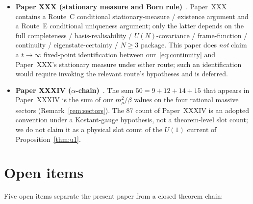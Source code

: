 \documentclass[11pt]{article}
\theoremstyle{definition}
\begin{document}
\begin{itemize}
    \item \textbf{Paper XXX (stationary measure and Born rule)}~\citep{SmartXXX}. Paper~XXX contains a Route~C conditional stationary-measure / existence argument and a Route~E conditional uniqueness argument; only the latter depends on the full completeness / basis-realisability / $U(N)$-covariance / frame-function / continuity / eigenstate-certainty / $N \geq 3$ package. This paper does \emph{not} claim a $t \to \infty$ fixed-point identification between our~\eqref{eq:continuity} and Paper~XXX's stationary measure under either route; such an identification would require invoking the relevant route's hypotheses and is deferred.
    \item \textbf{Paper XXXIV ($\alpha$-chain)}~\citep{SmartXXXIV}. The sum $50 = 9 + 12 + 14 + 15$ that appears in Paper~XXXIV is the sum of our $m_\rho^2 / \beta$ values on the four rational massive sectors (Remark~\ref{rem:sectors}). The $87$ count of Paper~XXXIV is an adopted convention under a Kostant-gauge hypothesis, not a theorem-level slot count; we do not claim it as a physical slot count of the $U(1)$ current of Proposition~\ref{thm:u1}.
\end{itemize}

\section{Open items}\label{sec:open}

Five open items separate the present paper from a closed theorem chain:
\end{document}
